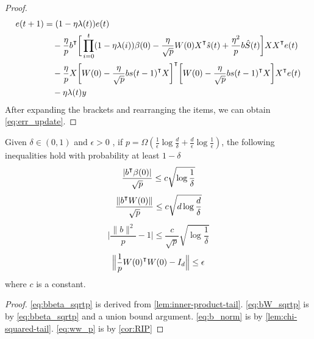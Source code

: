 \begin{proof}
\begin{equation*}
\begin{aligned}
    e(t+1) &= (1-\eta\lambda(t))e(t) \\
    &\quad-\frac{\eta}{p}b\transpose\bigg[ \prod_{i=0}^{t}(1-\eta\lambda(i))\beta(0) -\frac{\eta}{\sqrt p}W(0)X\transpose \hat{s}(t) +\frac{\eta^2}{p}b \hat{S}(t)\bigg]XX\transpose e(t) \\
    &\quad - \frac{\eta}{p}X\bigg[W(0) -\frac{\eta}{\sqrt p}bs(t-1)\transpose X\bigg]\transpose \bigg[W(0) -\frac{\eta}{\sqrt p}bs(t-1)\transpose X\bigg]X\transpose e(t)\\
    &\quad - \eta\lambda(t)y
\end{aligned}
\end{equation*}
After expanding the brackets and rearranging the items, we can obtain \eqref{eq:err_update}.
\end{proof}

\begin{lemma}
\label{lma:ineqs_2}
Given $\delta\in(0,1)$ and $\epsilon>0$ , if $p=\Omega(\frac{1}{\epsilon}\log\frac{d}{\delta}+\frac{d}{\epsilon}\log\frac{1}{\epsilon})$, the following inequalities hold with probability at least $1-\delta$
\begin{equation}
\label{eq:bbeta_sqrtp}
\frac{|b\transpose\beta(0)|}{\sqrt p}\leq c\sqrt{\log\frac{1}{\delta}}
\end{equation}
\begin{equation}
\label{eq:bW_sqrtp}
\frac{\|b\transpose W(0)\|}{\sqrt p}\leq c\sqrt{d\log\frac{d}{\delta}}
\end{equation}
\begin{equation}
\label{eq:b_norm}
\Big|\frac{\|b\|^2}{p}-1\Big| \leq  \frac{c}{\sqrt p}\sqrt {\log \frac{1}{\delta}}
\end{equation}
\begin{equation}
\label{eq:ww_p}
\Big\|\frac{1}{p}W(0)\transpose W(0) - I_d \Big\|\leq \epsilon
\end{equation}
where $c$ is a constant.
\end{lemma}

\begin{proof}
\eqref{eq:bbeta_sqrtp} is derived from \cref{lem:inner-product-tail}. \eqref{eq:bW_sqrtp} is by \eqref{eq:bbeta_sqrtp} and a union bound argument. \eqref{eq:b_norm} is by \cref{lem:chi-squared-tail}. \eqref{eq:ww_p} is by \cref{cor:RIP}
\end{proof}

